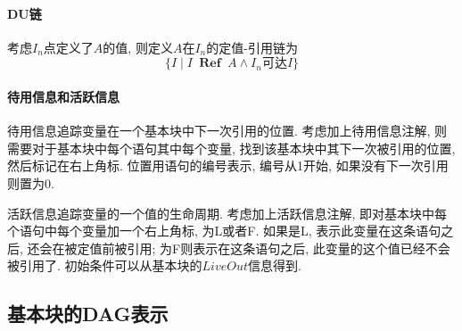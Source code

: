 \documentclass{ctexart}
\DeclareMathOperator{\Ref}{\;\mathbf{Ref}\;}
\begin{document}
\paragraph{DU链} 考虑$I_n$点定义了$A$的值, 则定义$A$在$I_n$的定值-引用链为
    \[\{ I \;|\; I \Ref A \land I_n \text{可达} I\}\]\par
\paragraph{待用信息和活跃信息}
    待用信息追踪变量在一个基本块中下一次引用的位置. 考虑加上待用信息注解,
    则需要对于基本块中每个语句其中每个变量, 找到该基本块中其下一次被引用的位置,
    然后标记在右上角标. 位置用语句的编号表示, 编号从1开始, 如果没有下一次引用则置为0.\par
    
    活跃信息追踪变量的一个值的生命周期. 考虑加上活跃信息注解,
    即对基本块中每个语句中每个变量加一个右上角标, 为L或者F.
    如果是L, 表示此变量在这条语句之后, 还会在被定值前被引用;
    为F则表示在这条语句之后, 此变量的这个值已经不会被引用了.
    初始条件可以从基本块的$LiveOut$信息得到.

\subsection{基本块的DAG表示}
\end{document}
